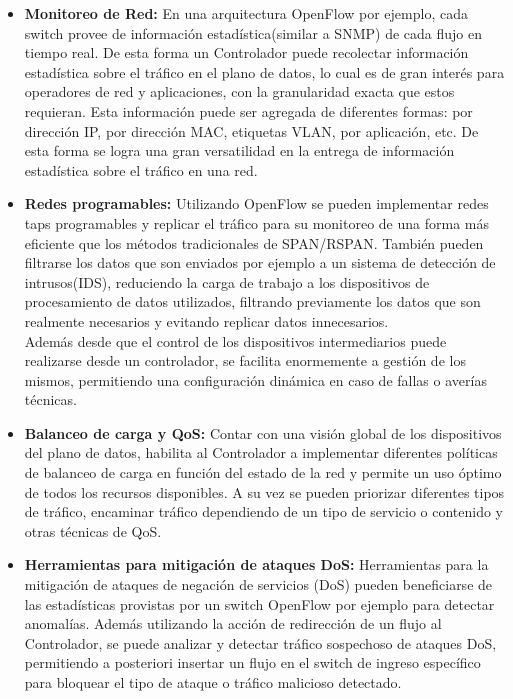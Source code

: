 \begin{itemize}

\item \textbf{Monitoreo de Red:}
En una arquitectura OpenFlow por ejemplo, cada switch provee de información estadística(similar a SNMP) de cada flujo en tiempo real. De esta forma un Controlador puede recolectar información estadística sobre el tráfico en el plano de datos, lo cual es de gran interés para operadores de red y aplicaciones, con la granularidad exacta que estos requieran. Esta información puede ser agregada de diferentes formas: por dirección IP, por dirección MAC, etiquetas VLAN, por aplicación, etc. De esta forma se logra una gran versatilidad en la entrega de información estadística sobre el tráfico en una red.

\item \textbf{Redes  programables:}
Utilizando OpenFlow se pueden implementar redes taps programables y replicar el tráfico para su monitoreo de una forma más eficiente que los métodos tradicionales de SPAN/RSPAN. También pueden filtrarse los datos que son enviados por ejemplo a un sistema de detección de intrusos(IDS), reduciendo la carga de trabajo a los dispositivos de procesamiento de datos utilizados, filtrando previamente los datos que son realmente necesarios y evitando replicar datos innecesarios.\\
Además desde que el control de los dispositivos intermediarios puede realizarse desde un controlador, se facilita enormemente a gestión de los mismos, permitiendo una configuración dinámica en caso de fallas o averías técnicas.

\item \textbf{Balanceo de carga y QoS:}
Contar con una visión global de los dispositivos del plano de datos, habilita al Controlador a implementar diferentes políticas de balanceo de carga en función del estado de la red y permite un uso óptimo de todos los recursos disponibles. A su vez se pueden priorizar diferentes tipos de tráfico, encaminar tráfico dependiendo de un tipo de servicio o contenido y otras técnicas de QoS.

\item \textbf{Herramientas para mitigación de ataques DoS:}
Herramientas para la mitigación de ataques de negación de servicios (DoS) pueden beneficiarse de las estadísticas provistas por un switch OpenFlow por ejemplo para detectar anomalías. Además utilizando la acción de redirección de un flujo al Controlador, se puede analizar y detectar tráfico sospechoso de ataques DoS, permitiendo a posteriori insertar un flujo en el switch de ingreso específico para bloquear el tipo de ataque o tráfico malicioso detectado.


\end{itemize}
